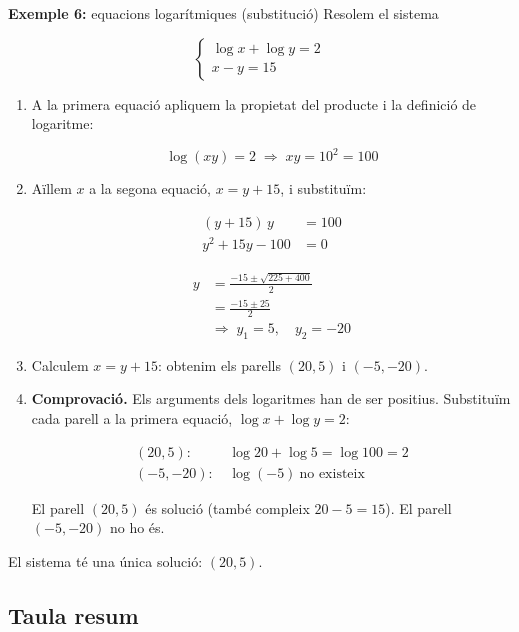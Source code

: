 \begin{exemple}{\textbf{Exemple 6:} equacions logarítmiques (substitució)}
Resolem el sistema

\[
\begin{cases}
\log x+\log y=2\\
x-y=15
\end{cases}
\]

\begin{enumerate}
\item A la primera equació apliquem la propietat del producte i la definició de logaritme:

\[
\log(xy)=2 \;\Rightarrow\; xy=10^2=100
\]
\item Aïllem $x$ a la segona equació, $x=y+15$, i substituïm:

\[
\begin{aligned}
(y+15)\,y&=100\\
y^2+15y-100&=0
\end{aligned}
\]

\[
\begin{aligned}y&=\frac{-15\pm\sqrt{225+400}}{2}\\ &=\frac{-15\pm 25}{2}\\ &\Rightarrow\; y_1=5,\quad y_2=-20\end{aligned}
\]
\item Calculem $x=y+15$: obtenim els parells $(20,5)$ i $(-5,-20)$.
\item \textbf{Comprovació.} Els arguments dels logaritmes han de ser positius. Substituïm cada parell a la primera equació, $\log x+\log y=2$:

\[
\begin{aligned}
(20,5)\text{: }&\log 20+\log 5=\log 100=2\\
(-5,-20)\text{: }&\log(-5)\ \text{no existeix}
\end{aligned}
\]

El parell $(20,5)$ és solució (també compleix $20-5=15$). El parell $(-5,-20)$ no ho és.
\end{enumerate}

El sistema té una única solució: $(20,5)$.
\end{exemple}

\subsection{Taula resum}

